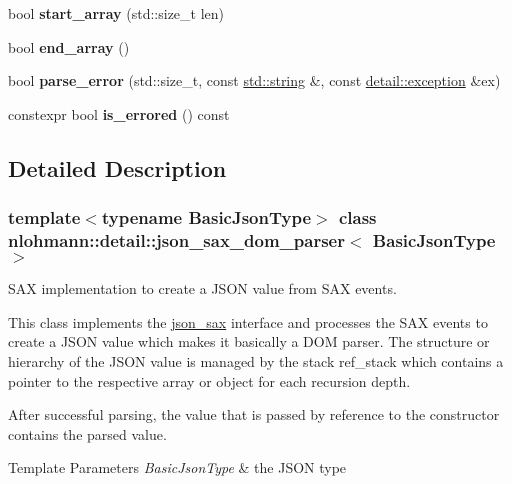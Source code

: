 \begin{DoxyCompactItemize}
bool {\bfseries start\+\_\+array} (std\+::size\+\_\+t len)
\item 
\mbox{\label{classnlohmann_1_1detail_1_1json__sax__dom__parser_af7cb5e5fe06ea908b0ce4ed762919759}} 
bool {\bfseries end\+\_\+array} ()
\item 
\mbox{\label{classnlohmann_1_1detail_1_1json__sax__dom__parser_a7d3bf1f361ebb817c694ba45b3814fa6}} 
bool {\bfseries parse\+\_\+error} (std\+::size\+\_\+t, const \mbox{\hyperlink{namespacenlohmann_1_1detail_a1ed8fc6239da25abcaf681d30ace4985ab45cffe084dd3d20d928bee85e7b0f21}{std\+::string}} \&, const \mbox{\hyperlink{classnlohmann_1_1detail_1_1exception}{detail\+::exception}} \&ex)
\item 
\mbox{\label{classnlohmann_1_1detail_1_1json__sax__dom__parser_ad1b9f3681fadbbb2e0127f5c8a99c662}} 
constexpr bool {\bfseries is\+\_\+errored} () const
\end{DoxyCompactItemize}


\subsection{Detailed Description}
\subsubsection*{template$<$typename Basic\+Json\+Type$>$\newline
class nlohmann\+::detail\+::json\+\_\+sax\+\_\+dom\+\_\+parser$<$ Basic\+Json\+Type $>$}

S\+AX implementation to create a J\+S\+ON value from S\+AX events. 

This class implements the \mbox{\hyperlink{structnlohmann_1_1json__sax}{json\+\_\+sax}} interface and processes the S\+AX events to create a J\+S\+ON value which makes it basically a D\+OM parser. The structure or hierarchy of the J\+S\+ON value is managed by the stack {\ttfamily ref\+\_\+stack} which contains a pointer to the respective array or object for each recursion depth.

After successful parsing, the value that is passed by reference to the constructor contains the parsed value.


\begin{DoxyTemplParams}{Template Parameters}
{\em Basic\+Json\+Type} & the J\+S\+ON type \\
\hline
\end{DoxyTemplParams}


